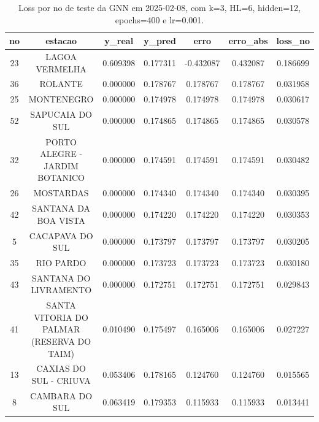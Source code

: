 \begin{table}[h]
\centering
\caption{Loss por no de teste da GNN em 2025-02-08, com k=3, HL=6, hidden=12, epochs=400 e lr=0.001.}
\label{tab:gnn_loss_k3_hl6_h12_e400_d20250208}
\begin{tabular}{ccccccc}
\toprule
no & estacao & y\_real & y\_pred & erro & erro\_abs & loss\_no \\
\midrule
23 & LAGOA VERMELHA & 0.609398 & 0.177311 & -0.432087 & 0.432087 & 0.186699 \\
36 & ROLANTE & 0.000000 & 0.178767 & 0.178767 & 0.178767 & 0.031958 \\
25 & MONTENEGRO & 0.000000 & 0.174978 & 0.174978 & 0.174978 & 0.030617 \\
52 & SAPUCAIA DO SUL & 0.000000 & 0.174865 & 0.174865 & 0.174865 & 0.030578 \\
32 & PORTO ALEGRE - JARDIM BOTANICO & 0.000000 & 0.174591 & 0.174591 & 0.174591 & 0.030482 \\
26 & MOSTARDAS & 0.000000 & 0.174340 & 0.174340 & 0.174340 & 0.030395 \\
42 & SANTANA DA BOA VISTA & 0.000000 & 0.174220 & 0.174220 & 0.174220 & 0.030353 \\
5 & CACAPAVA DO SUL & 0.000000 & 0.173797 & 0.173797 & 0.173797 & 0.030205 \\
35 & RIO PARDO & 0.000000 & 0.173723 & 0.173723 & 0.173723 & 0.030180 \\
43 & SANTANA DO LIVRAMENTO & 0.000000 & 0.172751 & 0.172751 & 0.172751 & 0.029843 \\
41 & SANTA VITORIA DO PALMAR (RESERVA DO TAIM) & 0.010490 & 0.175497 & 0.165006 & 0.165006 & 0.027227 \\
13 & CAXIAS DO SUL - CRIUVA & 0.053406 & 0.178165 & 0.124760 & 0.124760 & 0.015565 \\
8 & CAMBARA DO SUL & 0.063419 & 0.179353 & 0.115933 & 0.115933 & 0.013441 \\
\bottomrule
\end{tabular}
\end{table}

